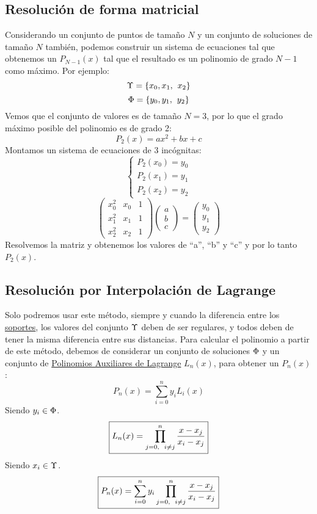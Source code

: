 \subsection{Resolución de forma matricial}
 Considerando un conjunto de puntos de tamaño \(N\) y un conjunto de soluciones de tamaño \(N\) también, podemos construir un sistema de ecuaciones tal que obtenemos un \(P_{N-1}(x)\) tal que el resultado es un polinomio de grado \(N-1\) como máximo. Por ejemplo:
\[
        \Large{\Upsilon} = \left \{ x_0, x_1, \right. \left. x_2 \right \}
\]
\[
        \Large{\Phi}= \left \{ y_0, y_1, \right. \left. y_2 \right \}
\]
 Vemos que el conjunto de valores es de tamaño \(N = 3\), por lo que el grado máximo posible del polinomio es de grado 2:
\[
        P_2(x) = ax^2 + bx + c
\]
 Montamos un sistema de ecuaciones de 3 incógnitas:
\[
        \begin{cases}
                P_2(x_0) = y_0
                \\
                P_2(x_1) = y_1
                \\
                P_2(x_2) = y_2
        \end{cases}
\]
\[
        \begin{pmatrix}
                x^2_0 & x_0 & 1 \\
                x^2_1 & x_1 & 1 \\
                x^2_2 & x_2 & 1
        \end{pmatrix}
        \begin{pmatrix}
                a
                \\
                b
                \\
                c
        \end{pmatrix}
        =
        \begin{pmatrix}
                y_0
                \\
                y_1
                \\
                y_2
        \end{pmatrix}
\]
 Resolvemos la matriz y obtenemos los valores de ``a'', ``b'' y ``c'' y por lo tanto \(P_2(x)\).
\subsection{Resolución por Interpolación de Lagrange}
 Solo podremos usar este método, siempre y cuando la diferencia entre los \underline{soportes}, los valores del conjunto \(\Large{\Upsilon}\) deben de ser regulares, y todos deben de tener la misma diferencia entre sus distancias.
 Para calcular el polinomio a partir de este método, debemos de considerar un conjunto de soluciones \(\Large{\Phi}\) y un conjunto de \underline{Polinomios Auxiliares de Lagrange} \(L_n(x)\), para obtener un \(P_n(x)\):
\[
        \boxed{P_n(x) = \sum^n_{i=0} y_iL_i(x)}
\]
 \hspace{6.2cm} Siendo \(y_i \in \Large{\Phi}\).
\[
        \boxed{L_n(x) = \prod^n_{j=0, \hspace{2mm} i \neq j} \frac{x- x_j}{x_i - x_j}}
\]
 \hspace{6.2cm} Siendo \(x_i \in \Large{\Upsilon}\).
\[
        \boxed{P_n(x) = \sum^n_{i=0} y_i \prod^n_{j=0, \hspace{2mm} i \neq j} \frac{x- x_j}{x_i - x_j}}
\]
